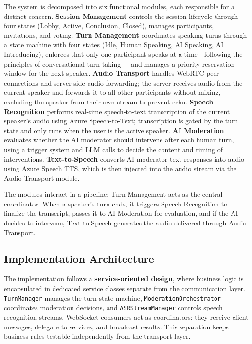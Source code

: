 The system is decomposed into six functional modules, each responsible for a distinct concern. \textbf{Session Management} controls the session lifecycle through four states (Lobby, Active, Conclusion, Closed), manages participants, invitations, and voting. \textbf{Turn Management} coordinates speaking turns through a state machine with four states (Idle, Human Speaking, AI Speaking, AI Introducing), enforces that only one participant speaks at a time---following the principles of conversational turn-taking~\cite{Sacks1974TurnTaking}---and manages a priority reservation window for the next speaker. \textbf{Audio Transport} handles WebRTC peer connections and server-side audio forwarding; the server receives audio from the current speaker and forwards it to all other participants without mixing, excluding the speaker from their own stream to prevent echo. \textbf{Speech Recognition} performs real-time speech-to-text transcription of the current speaker's audio using Azure Speech-to-Text; transcription is gated by the turn state and only runs when the user is the active speaker. \textbf{AI Moderation} evaluates whether the AI moderator should intervene after each human turn, using a trigger system and LLM calls to decide the content and timing of interventions. \textbf{Text-to-Speech} converts AI moderator text responses into audio using Azure Speech TTS, which is then injected into the audio stream via the Audio Transport module.

The modules interact in a pipeline: Turn Management acts as the central coordinator. When a speaker's turn ends, it triggers Speech Recognition to finalize the transcript, passes it to AI Moderation for evaluation, and if the AI decides to intervene, Text-to-Speech generates the audio delivered through Audio Transport.



\subsection{Implementation Architecture}

The implementation follows a \textbf{service-oriented design}, where business logic is encapsulated in dedicated service classes separate from the communication layer. \texttt{TurnManager} manages the turn state machine, \texttt{ModerationOrchestrator} coordinates moderation decisions, and \texttt{ASRStreamManager} controls speech recognition streams. WebSocket consumers act as coordinators: they receive client messages, delegate to services, and broadcast results. This separation keeps business rules testable independently from the transport layer.


